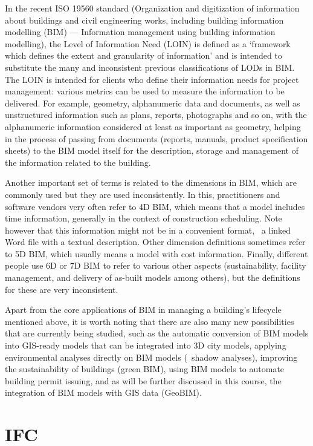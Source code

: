In the recent ISO 19560 standard (Organization and digitization of information about buildings and civil engineering works, including building information modelling (BIM) --- Information management using building information modelling), the Level of Information Need (LOIN) is defined as a `framework which defines the extent and granularity of information' and is intended to substitute the many and inconsistent previous classifications of LODs in BIM\@.
The LOIN is intended for clients who define their information needs for project management: various metrics can be used to measure the information to be delivered.
For example, geometry, alphanumeric data and documents, as well as unstructured information such as plans, reports, photographs and so on, with the alphanumeric information considered at least as important as geometry, helping in the process of passing from documents (reports, manuals, product specification sheets) to the BIM model itself for the description, storage and management of the information related to the building.

Another important set of terms is related to the dimensions in BIM, which are commonly used but they are used inconsistently\@.
In this, practitioners and software vendors very often refer to 4D BIM, which means that a model includes time information, generally in the context of construction scheduling.
Note however that this information might not be in a convenient format, \eg\ a linked Word file with a textual description.
Other dimension definitions sometimes refer to 5D BIM, which usually means a model with cost information.
Finally, different people use 6D or 7D BIM to refer to various other aspects (sustainability, facility management, and delivery of as-built models among others), but the definitions for these are very inconsistent.

Apart from the core applications of BIM in managing a building's lifecycle mentioned above, it is worth noting that there are also many new possibilities that are currently being studied, such as the automatic conversion of BIM models into GIS-ready models that can be integrated into 3D city models, applying environmental analyses directly on BIM models (\eg\ shadow analyses), improving the sustainability of buildings (green BIM), using BIM models to automate building permit issuing, and as will be further discussed in this course, the integration of BIM models with GIS data (GeoBIM).

\section{IFC}


